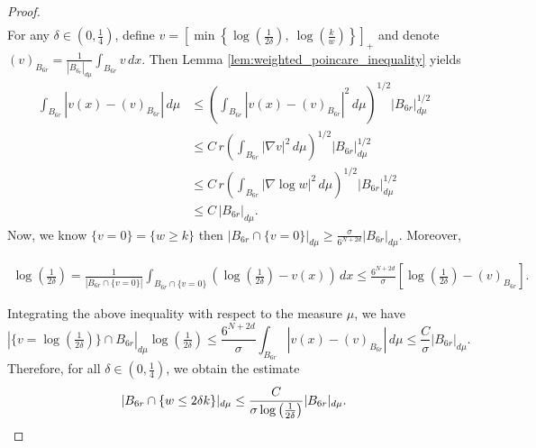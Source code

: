 \documentclass[11pt]{article}
\begin{document}
\begin{proof}
\begin{align*}
\end{align*}
For any \( \delta \in (0, \tfrac{1}{4}) \), define $v = \left[ \min \left\{ \log \left( \frac{1}{2\delta} \right),~ \log \left( \frac{k}{w} \right) \right\} \right]_+$ and
denote $(v)_{B_{6r}} = \frac{1}{|B_{6_r}|_{d\mu}} \int_{B_{6r}}v \, dx$. Then Lemma \ref{lem:weighted_poincare_inequality} yields
\begin{align*}
\int_{B_{6r}} |v(x) - (v)_{B_{6r}}| \, d\mu & \leq \left( \int_{B_{6r}} |v(x) - (v)_{B_{6r}}|^2 \, d\mu \right)^{1/2}   |B_{6r}|_{d\mu}^{1/2} \\
&\leq  C \, r \left( \int_{B_{6r}} |\nabla v|^2 \, d\mu \right)^{1/2}   |B_{6r}|_{d\mu}^{1/2} \\
& \leq C \, r \left( \int_{B_{6r}} |\nabla \log w|^2 \, d\mu \right)^{1/2}   |B_{6r}|_{d\mu}^{1/2} \\
& \leq  C \, |B_{6r}|_{d\mu}.
\end{align*}
Now, we know $ \{ v = 0 \} =  \{ w \geq k \}$ then $    |B_{6r} \cap \{ v = 0 \}|_{d\mu} \geq \frac{\sigma}{6^{N+2d}} |B_{6r}|_{d\mu}$.  Moreover,

\small{\begin{align*}
    \log \left( \frac{1}{2\delta} \right) = \frac{1}{|B_{6r} \cap \{ v = 0 \}|} \int_{B_{6r} \cap \{ v = 0 \}} \left( \log \left( \frac{1}{2\delta} \right) - v(x) \right) \, dx \leq \frac{6^{N+2d}}{\sigma} \left[ \log \left( \frac{1}{2\delta} \right) - (v)_{B_{6r}} \right].
\end{align*}}

Integrating the above inequality with respect to the measure $\mu$, we have
\begin{equation*}
    \left|\{ v = \log \left( \tfrac{1}{2\delta} \right) \} \cap B_{6r}\right|_{d\mu}   \log \left( \tfrac{1}{2\delta} \right)
    \leq \frac{6^{N+2d}}{\sigma} \int_{B_{6r}} |v(x) - (v)_{B_{6r}}| \, d\mu
    \leq \frac{C}{\sigma} |B_{6r}|_{d\mu}.
\end{equation*}
Therefore, for all $\delta \in \left( 0, \tfrac{1}{4} \right)$, we obtain the estimate
\begin{equation*} 
    |B_{6r} \cap \{ w \leq 2\delta k \}|_{d\mu} 
    \leq \frac{C}{\sigma \log \left( \frac{1}{2\delta} \right)} |B_{6r}|_{d\mu}. \qedhere
\end{equation*}
\end{proof}
\medskip
\end{document}
